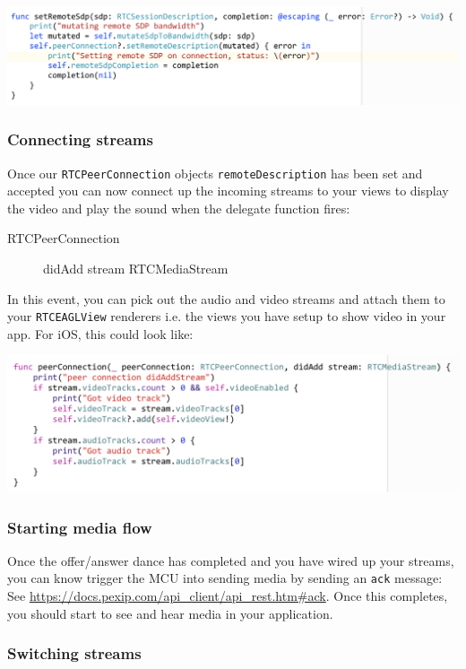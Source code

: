 \documentclass[a4paper,11pt]{article}
\begin{document}
\includegraphics[width=.9\linewidth]{./images/remote_sdp.png}

\subsubsection{Connecting streams}
\label{sec:orgheadline26}

Once our \texttt{RTCPeerConnection} objects \texttt{remoteDescription} has been set
and accepted you can now connect up the incoming streams to your views
to display the video and play the sound when the delegate function fires:

\begin{description}
\item[{RTCPeerConnection}] didAdd stream RTCMediaStream
\end{description}

In this event, you can pick out the audio and video streams and attach
them to your \texttt{RTCEAGLView} renderers i.e. the views you have setup to
show video in your app.  For iOS, this could look like:

\includegraphics[width=.9\linewidth]{./images/add_stream.png}

\subsubsection{Starting media flow}
\label{sec:orgheadline27}

Once the offer/answer dance has completed and you have wired up your
streams, you can know trigger the MCU into sending media by sending an
\texttt{ack} message: See \url{https://docs.pexip.com/api_client/api_rest.htm#ack}.
Once this completes, you should start to see and hear media in your
application.

\subsubsection{Switching streams}
\label{sec:orgheadline28}
\end{document}

